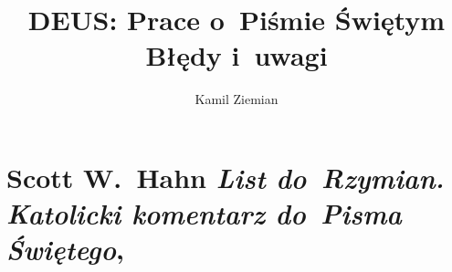 \documentclass[a4paper,11pt]{article}
\title{DEUS: Prace o~Piśmie Świętym \\
  {\Large Błędy i~uwagi}}
\author{Kamil Ziemian}
\numberwithin{equation}{section}
\begin{document}





\maketitle





\section{Scott W.~Hahn \textit{List do~Rzymian. Katolicki
    komentarz do~Pisma Świętego},
  \parencite{HahnListDoRzymianKatolickiETC2021}}



































\end{document}
